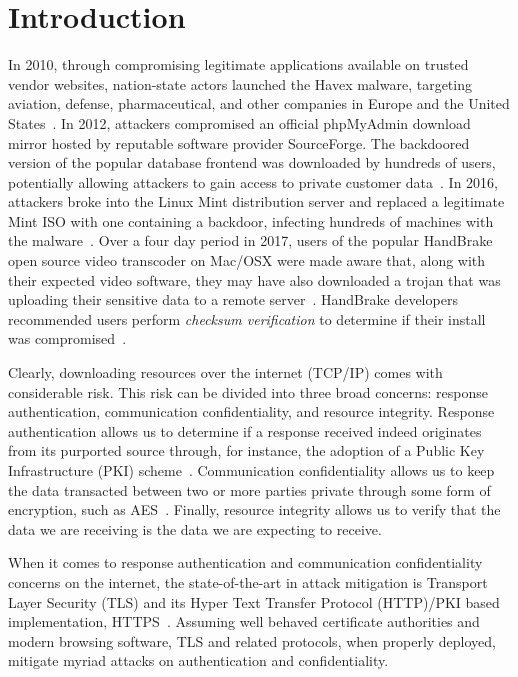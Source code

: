 \section{Introduction} \label{sec:introduction}

In 2010, through compromising legitimate applications available on trusted
vendor websites, nation-state actors launched the Havex malware, targeting
aviation, defense, pharmaceutical, and other companies in Europe and the United
States~\cite{SCA-HAVEX1, SCA-HAVEX2}. In 2012, attackers compromised an official
phpMyAdmin download mirror hosted by reputable software provider SourceForge.
The backdoored version of the popular database frontend was downloaded by
hundreds of users, potentially allowing attackers to gain access to private
customer data~\cite{SCA-PMA1, SCA-PMA2}. In 2016, attackers broke into the Linux
Mint distribution server and replaced a legitimate Mint ISO with one containing
a backdoor, infecting hundreds of machines with the malware~\cite{SCA-MINT1,
SCA-MINT2}. Over a four day period in 2017, users of the popular HandBrake open
source video transcoder on Mac/OSX were made aware that, along with their
expected video software, they may have also downloaded a trojan that was
uploading their sensitive data to a remote server~\cite{SCA-HB1}. HandBrake
developers recommended users perform \emph{checksum verification} to determine
if their install was compromised~\cite{SCA-HB2}.

Clearly, downloading resources over the internet (TCP/IP) comes with
considerable risk. This risk can be divided into three broad concerns: response
authentication, communication confidentiality, and resource integrity. Response
authentication allows us to determine if a response received indeed originates
from its purported source through, for instance, the adoption of a Public Key
Infrastructure (PKI) scheme~\cite{PKI}. Communication confidentiality allows us
to keep the data transacted between two or more parties private through some
form of encryption, such as AES~\cite{AES}. Finally, resource integrity allows
us to verify that the data we are receiving is the data we are expecting to
receive.

When it comes to response authentication and communication confidentiality
concerns on the internet, the state-of-the-art in attack mitigation is Transport
Layer Security (TLS) and its Hyper Text Transfer Protocol (HTTP)/PKI based
implementation, HTTPS~\cite{TLS1.2, TLS1, TLS0, HTTPS, PKI}. Assuming well
behaved certificate authorities and modern browsing software, TLS and related
protocols, when properly deployed, mitigate myriad attacks on authentication and
confidentiality.

